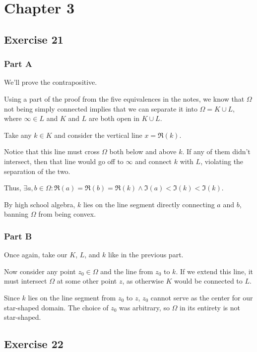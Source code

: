 \documentclass[12pt]{article}
\begin{document}
\section{Chapter 3}

\subsection{Exercise 21}

\subsubsection{Part A}

We'll prove the contrapositive.

Using a part of the proof from the five equivalences in the notes,
we know that $\Omega$ not being simply connected implies that
we can separate it into $\Omega = K \cup L$, where $\infty \in L$ and
$K$ and $L$ are both open in $K \cup L$.

Take any $k \in K$ and consider the vertical line $x=\Re(k)$.

Notice that this line must cross $\Omega$ both below and above $k$.
If any of them didn't intersect, then that line would go off to $\infty$
and connect $k$ with $L$, violating the separation of the two.

Thus, $\exists a, b \in \Omega: \Re(a)=\Re(b)=\Re(k) \land \Im(a) < \Im(k) < \Im(k)$.

By high school algebra, $k$ lies on the line segment directly connecting $a$ and $b$,
banning $\Omega$ from being convex.

\subsubsection{Part B}

Once again, take our $K$, $L$, and $k$ like in the previous part.

Now consider any point $z_0 \in \Omega$ and the line from $z_0$ to $k$.
If we extend this line, it must intersect $\Omega$ at some other point $z$,
as otherwise $K$ would be connected to $L$.

Since $k$ lies on the line segment from $z_0$ to $z$, $z_0$ cannot serve as the
center for our star-shaped domain.
The choice of $z_0$ was arbitrary, so $\Omega$ in its entirety is not star-shaped.

\subsection{Exercise 22}
\end{document}
